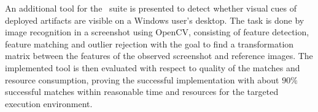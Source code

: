 An additional tool for the \ape~suite is presented to detect whether visual cues of deployed artifacts are visible on a Windows user's desktop. The task is done by image recognition in a screenshot using OpenCV, consisting of feature detection, feature matching and outlier rejection with the goal to find a transformation matrix between the features of the observed screenshot and reference images. The implemented tool is then evaluated with respect to quality of the matches and resource consumption, proving the successful implementation with about $90\%$ successful matches within reasonable time and resources for the targeted execution environment.
